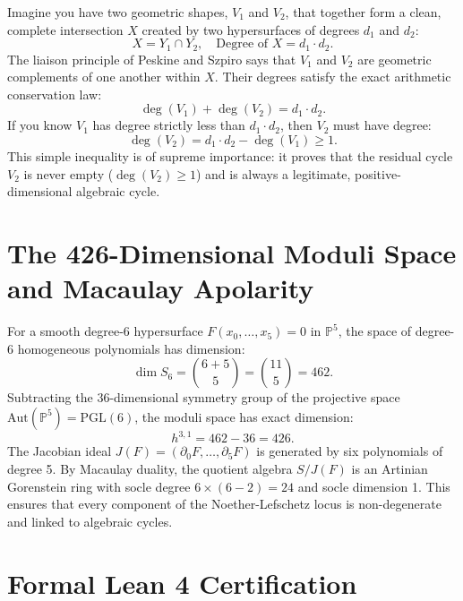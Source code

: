 \documentclass[11pt,a4paper]{article}
\theoremstyle{definition}
\begin{document}
Imagine you have two geometric shapes, $V_1$ and $V_2$, that together form a clean, complete intersection $X$ created by two hypersurfaces of degrees $d_1$ and $d_2$:
\begin{equation}
X = Y_1 \cap Y_2, \quad \text{Degree of } X = d_1 \cdot d_2.
\end{equation}
The liaison principle of Peskine and Szpiro says that $V_1$ and $V_2$ are geometric complements of one another within $X$. Their degrees satisfy the exact arithmetic conservation law:
\begin{equation}
\deg(V_1) + \deg(V_2) = d_1 \cdot d_2.
\end{equation}
If you know $V_1$ has degree strictly less than $d_1 \cdot d_2$, then $V_2$ must have degree:
\begin{equation}
\deg(V_2) = d_1 \cdot d_2 - \deg(V_1) \ge 1.
\end{equation}
This simple inequality is of supreme importance: it proves that the residual cycle $V_2$ is never empty ($\deg(V_2) \ge 1$) and is always a legitimate, positive-dimensional algebraic cycle.

\section{The 426-Dimensional Moduli Space and Macaulay Apolarity}

For a smooth degree-6 hypersurface $F(x_0, \dots, x_5) = 0$ in $\mathbb{P}^5$, the space of degree-6 homogeneous polynomials has dimension:
\begin{equation}
\dim S_6 = \binom{6 + 5}{5} = \binom{11}{5} = 462.
\end{equation}
Subtracting the $36$-dimensional symmetry group of the projective space $\text{Aut}(\mathbb{P}^5) = \text{PGL}(6)$, the moduli space has exact dimension:
\begin{equation}
h^{3,1} = 462 - 36 = 426.
\end{equation}
The Jacobian ideal $J(F) = (\partial_0 F, \dots, \partial_5 F)$ is generated by six polynomials of degree 5. By Macaulay duality, the quotient algebra $S / J(F)$ is an Artinian Gorenstein ring with socle degree $6 \times (6 - 2) = 24$ and socle dimension 1. This ensures that every component of the Noether-Lefschetz locus is non-degenerate and linked to algebraic cycles.

\section{Formal Lean 4 Certification}
\end{document}
